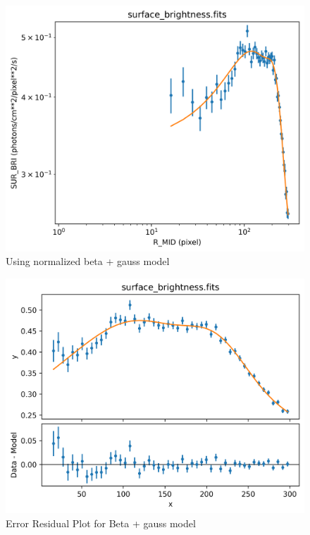 \documentclass[a4paper,12pt]{article}
\begin{document}
\begin{figure}[h!]
    \centering\includegraphics[width=\linewidth]{beta_gauss_fit.png}
    \caption{Using normalized beta + gauss model}
    \label{fig:Beta Gauss Model}
\end{figure}

\begin{figure}[h!]
    \centering\includegraphics[width=\linewidth]{beta_gauss_resid.png}
    \caption{Error Residual Plot for Beta + gauss model}
    \label{fig:Beta Gauss Resid}
\end{figure}
\end{document}
